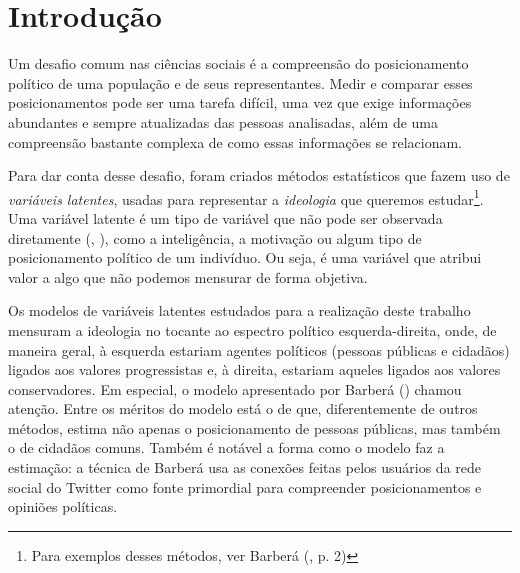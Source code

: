 \documentclass[
	12pt,				%
	openright,			%
	twoside,			%
	a4paper,			%
	english,			%
	brazil				%
	]{abntex2}
\begin{document}

%


\chapter{Introdução}
 Um desafio comum nas ciências sociais é a compreensão do posicionamento político de uma população e de seus representantes. Medir e comparar esses posicionamentos pode ser uma tarefa difícil, uma vez que exige informações abundantes e sempre atualizadas das pessoas analisadas, além de uma compreensão bastante complexa de como essas informações se relacionam.

 Para dar conta desse desafio, foram criados métodos estatísticos que fazem uso de \emph{variáveis latentes}, usadas para representar a \emph{ideologia} que queremos estudar\footnote{Para exemplos desses métodos, ver Barberá (\citeyear{barbera2015}, p. 2)}. Uma variável latente é um tipo de variável que não pode ser observada diretamente (, \citeyear{fox2010}), como a inteligência, a motivação ou algum tipo de posicionamento político de um indivíduo. Ou seja, é uma variável que atribui valor a algo que não podemos mensurar de forma objetiva.

 Os modelos de variáveis latentes estudados para a realização deste trabalho mensuram a ideologia no tocante ao espectro político esquerda-direita, onde, de maneira geral, à esquerda estariam agentes políticos (pessoas públicas e cidadãos) ligados aos valores progressistas e, à direita, estariam aqueles ligados aos valores conservadores. Em especial, o modelo apresentado por Barberá (\citeyear{barbera2015}) chamou atenção. Entre os méritos do modelo está o de que, diferentemente de outros métodos, estima não apenas o posicionamento de pessoas públicas, mas também o de cidadãos comuns. Também é notável a forma como o modelo faz a estimação: a técnica de Barberá usa as conexões feitas pelos usuários da rede social do Twitter como fonte primordial para compreender posicionamentos e opiniões políticas.
\end{document}
